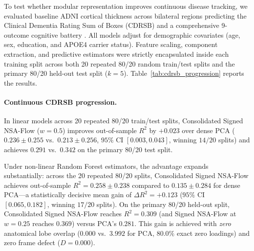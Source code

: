 \documentclass[11pt]{article}
\theoremstyle{definition}
\begin{document}
To test whether modular representation improves continuous disease tracking, we evaluated baseline ADNI cortical thickness across bilateral regions predicting the Clinical Dementia Rating Sum of Boxes (CDRSB) and a comprehensive 9-outcome cognitive battery \citep{petersen2010}. All models adjust for demographic covariates (age, sex, education, and APOE4 carrier status). Feature scaling, component extraction, and predictive estimators were strictly encapsulated inside each training split across both 20 repeated 80/20 random train/test splits and the primary 80/20 held-out test split ($k=5$). Table~\ref{tab:cdrsb_progression} reports the results.



\paragraph{Continuous CDRSB progression.}
In linear models across 20 repeated 80/20 train/test splits, Consolidated Signed NSA-Flow ($w=0.5$) improves out-of-sample $R^2$ by $+0.023$ over dense PCA ($0.236 \pm 0.255$ vs.\ $0.213 \pm 0.256$, $95\%$ CI $[0.003, 0.043]$, winning $14/20$ splits) and achieves $0.291$ vs.\ $0.342$ on the primary 80/20 test split.

Under non-linear Random Forest estimators, the advantage expands substantially: across the 20 repeated 80/20 splits, Consolidated Signed NSA-Flow achieves out-of-sample $R^2 = 0.258 \pm 0.238$ compared to $0.135 \pm 0.284$ for dense PCA---a statistically decisive mean gain of $\Delta R^2 = +0.123$ ($95\%$ CI $[0.065, 0.182]$, winning $17/20$ splits). On the primary 80/20 held-out split, Consolidated Signed NSA-Flow reaches $R^2 = 0.309$ (and Signed NSA-Flow at $w=0.25$ reaches $0.369$) versus PCA's $0.281$. This gain is achieved with \emph{zero} anatomical lobe overlap ($0.000$ vs.\ $3.992$ for PCA, $80.0\%$ exact zero loadings) and zero frame defect ($D = 0.000$).
\end{document}
